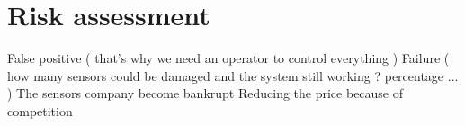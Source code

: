 \section{Risk assessment}

False positive ( that's why we need an operator to control everything )
Failure ( how many sensors could be damaged and the system still working ? percentage ... )
The sensors company become bankrupt 
Reducing the price because of competition
